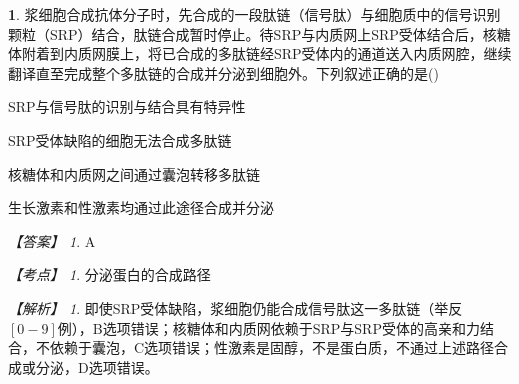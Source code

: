 \documentclass[UTF8, 10pt, a4paper, oneside]{ctexart}
\theoremstyle{definition}
\newtheorem{exercise}{}
\theoremstyle{remark}
\newtheorem*{answer}{【答案】}
\newtheorem*{point}{【考点】}      %
\newtheorem*{explanation}{【解析】}     %
\theoremstyle{plain}
\begin{document}
\begin{exercise}
    浆细胞合成抗体分子时，先合成的一段肽链（信号肽）与细胞质中的信号识别颗粒（SRP）结合，肽链合成暂时停止。待SRP与内质网上SRP受体结合后，核糖体附着到内质网膜上，将已合成的多肽链经SRP受体内的通道送入内质网腔，继续翻译直至完成整个多肽链的合成并分泌到细胞外。下列叙述正确的是\quad(\quad)
    \begin{adjustwidth}{2em}{}
        \begin{asparaenum}[A. ]
            \item SRP与信号肽的识别与结合具有特异性
            \item SRP受体缺陷的细胞无法合成多肽链
            \item 核糖体和内质网之间通过囊泡转移多肽链
            \item 生长激素和性激素均通过此途径合成并分泌
        \end{asparaenum}
    \end{adjustwidth}
    \begin{answer}
        A
    \end{answer}
    \begin{point}
        分泌蛋白的合成路径
    \end{point}
    \begin{explanation}
        即使SRP受体缺陷，浆细胞仍能合成信号肽这一多肽链（举反\([0-9]\)例），B选项错误；核糖体和内质网依赖于SRP与SRP受体的高亲和力结合，不依赖于囊泡，C选项错误；性激素是固醇，不是蛋白质，不通过上述路径合成或分泌，D选项错误。
    \end{explanation}
\end{exercise}
\end{document}
